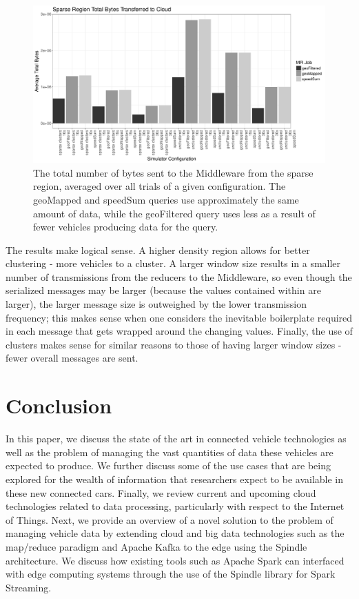 \documentclass{thesis}
\begin{document}
    \begin{figure}
            \includegraphics[width=\textwidth]{binImages/sparseConfigs.pdf}
            \caption{The total number of bytes sent to the Middleware from the sparse region, averaged over all trials of a given configuration.
                The geoMapped and speedSum queries use approximately the same amount of data, while the geoFiltered
                query uses less as a result of fewer vehicles producing data for the query.}

    \end{figure}

    The results make logical sense. A higher density region allows for better clustering - more vehicles to a cluster.
    A larger window size results in a smaller number of transmissions from the reducers to the Middleware, so even
    though the serialized messages may be larger (because the values contained within are larger), the larger message
    size is outweighed by the lower transmission frequency; this makes sense when one considers the inevitable boilerplate
    required in each message that gets wrapped around the changing values. Finally, the use of clusters makes sense for
    similar reasons to those of having larger window sizes - fewer overall messages are sent.


\chapter{Conclusion}
    In this paper, we discuss the state of the art in connected vehicle technologies as well as the problem
    of managing the vast quantities of data these vehicles are expected to produce. We further discuss
    some of the use cases that are being explored for the wealth of information that researchers expect
    to be available in these new connected cars. Finally, we review current and upcoming cloud technologies
    related to data processing, particularly with respect to the Internet of Things. Next, we provide an
    overview of a novel solution to the problem of managing vehicle data by extending cloud and big data 
    technologies such as the map/reduce paradigm and Apache Kafka to the edge using the Spindle architecture.
    We discuss how existing tools such as Apache Spark can interfaced with edge computing systems through
    the use of the Spindle library for Spark Streaming.
\end{document}
